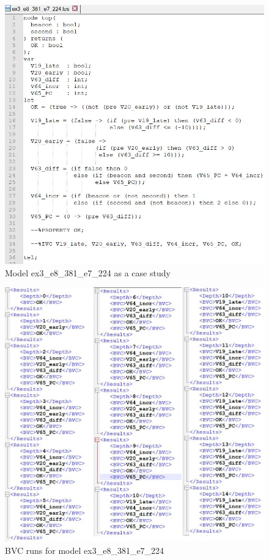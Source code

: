  \begin{figure}
 \centering
  \includegraphics[width=\columnwidth]{figs/expl.jpg}
  \caption{Model ex3\_e8\_381\_e7\_224 as a case study}
  \vspace{0.1in}
  \label{fig:expl}
\end{figure}

\begin{figure}
 \centering
  \includegraphics[width=\columnwidth]{figs/explout.png}
  \caption{BVC runs for model ex3\_e8\_381\_e7\_224}
  \vspace{0.1in}
  \label{fig:explout}
\end{figure}


